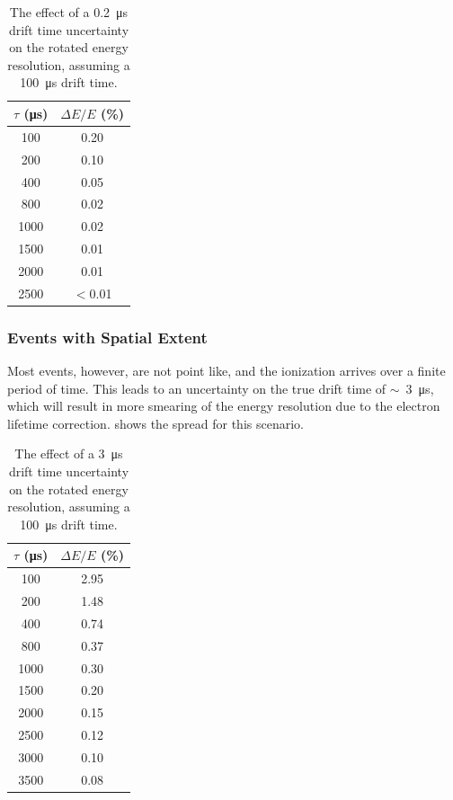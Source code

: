 \documentclass[herrin-thesis.tex]{subfiles}
\begin{document}
\begin{table}[htd]
\centering
\begin{tabular}{c|c}
	\(\tau\) (\si{\micro\second})	&	\(\Delta E / E\) (\%) 	\\ \hline
	100					&	0.20				\\
	200					&	0.10				\\
	400					&	0.05				\\
	800					&	0.02				\\
	1000					&	0.02				\\
	1500					&	0.01				\\
	2000					&	0.01				\\
	2500					&	\(<\)0.01			
\end{tabular}
\caption[Drift time uncertainty effect on resolution]{The effect of a \SI{0.2}{\micro\second} drift time uncertainty on the rotated energy resolution, assuming a \SI{100}{\micro\second} drift time.}
\label{tab:el_res_dt_ideal}
\end{table}

\subsubsection{Events with Spatial Extent}
Most events, however, are not point like, and the ionization arrives over a finite period of time. This leads to an uncertainty on the true drift time of \(\sim\)~\SI{3}{\micro\second}, which will result in more smearing of the energy resolution due to the electron lifetime correction.  shows the spread for this scenario.

\begin{table}[htd]
\centering
\begin{tabular}{c|c}
	\(\tau\) (\si{\micro\second})	&	\(\Delta E / E\) (\%) 	\\ \hline
	100					&	2.95				\\
	200					&	1.48				\\
	400					&	0.74				\\
	800					&	0.37				\\
	1000					&	0.30				\\
	1500					&	0.20				\\
	2000					&	0.15				\\
	2500					&	0.12				\\
	3000					&	0.10				\\
	3500					&	0.08
\end{tabular}
\caption[Drift time uncertainty effect on resolution]{The effect of a \SI{3}{\micro\second} drift time uncertainty on the rotated energy resolution, assuming a \SI{100}{\micro\second} drift time.}
\label{tab:el_res_dt}
\end{table}
\end{document}
